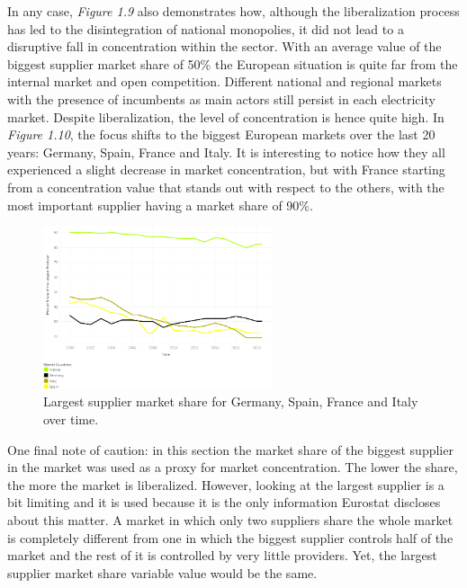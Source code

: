 \documentclass{book}
\begin{document}
In any case, \textit{Figure 1.9} also demonstrates how, although the liberalization process has led to the disintegration of national monopolies, it did not lead to a disruptive fall in concentration within the sector. With an average value of the biggest  supplier market share of 50\% the European situation is quite far from the internal market and open competition. Different national and regional markets with the presence of incumbents as main actors still persist in each electricity market. Despite liberalization, the level of concentration is hence quite high.  In \textit{Figure 1.10}, the focus shifts to the biggest European markets over the last 20 years: Germany, Spain, France and Italy. It is interesting to notice how they all experienced a slight decrease in market concentration, but with France starting from a concentration value that stands out with respect to the others, with the most important supplier having a market share of 90\%.

\bigskip
\begin{figure}[H]
\begin{center}
\captionsetup{justification=centering}
\includegraphics[width=0.6\textwidth]{Images/conc-mc.png}
\caption{Largest supplier market share for Germany, Spain, France and Italy over time. }
\end{center}
\end{figure}
\bigskip

One final note of caution: in this section the market share of the biggest supplier in the market was used as a proxy for market concentration. The lower the share, the more the market is liberalized. However, looking at the largest supplier is a bit limiting and it is used because it is the only information Eurostat discloses about this matter. A market in which only two suppliers share the whole market is completely different from one in which the biggest supplier controls half of the market and the rest of it is controlled by very little providers. Yet, the largest supplier market share variable value would be the same.
\end{document}
